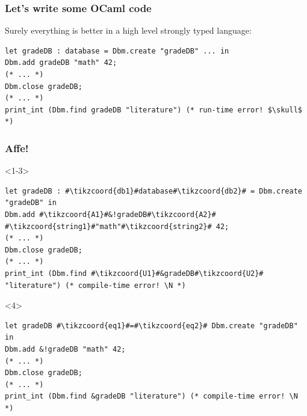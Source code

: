 \documentclass[aspectratio=169,dvipsnames,svgnames,10pt]{beamer}
\newcommand\N{{\color{Red}{\ding{56}}}}
\begin{document}
\begin{frame}[fragile]
  \frametitle{Let's write some OCaml code}

  Surely everything is better in a high level strongly typed language:
  
\begin{verbatim}
let gradeDB : database = Dbm.create "gradeDB" ... in
Dbm.add gradeDB "math" 42;
(* ... *)
Dbm.close gradeDB;
(* ... *)
print_int (Dbm.find gradeDB "literature") (* run-time error! $\skull$ *)
\end{verbatim}
  
\end{frame}

\begin{frame}[fragile]
  \frametitle{Affe!}

  \begin{onlyenv}<1-3>
\begin{verbatim}
let gradeDB : #\tikzcoord{db1}#database#\tikzcoord{db2}# = Dbm.create "gradeDB" in
Dbm.add #\tikzcoord{A1}#&!gradeDB#\tikzcoord{A2}# #\tikzcoord{string1}#"math"#\tikzcoord{string2}# 42;
(* ... *)
Dbm.close gradeDB;
(* ... *)
print_int (Dbm.find #\tikzcoord{U1}#&gradeDB#\tikzcoord{U2}# "literature") (* compile-time error! \N *)
\end{verbatim}
  \end{onlyenv}
  \begin{onlyenv}<4>
\begin{verbatim}
let gradeDB #\tikzcoord{eq1}#=#\tikzcoord{eq2}# Dbm.create "gradeDB" in
Dbm.add &!gradeDB "math" 42;
(* ... *)
Dbm.close gradeDB;
(* ... *)
print_int (Dbm.find &gradeDB "literature") (* compile-time error! \N *)
\end{verbatim}
  \end{onlyenv}
  

\end{frame}
\end{document}
